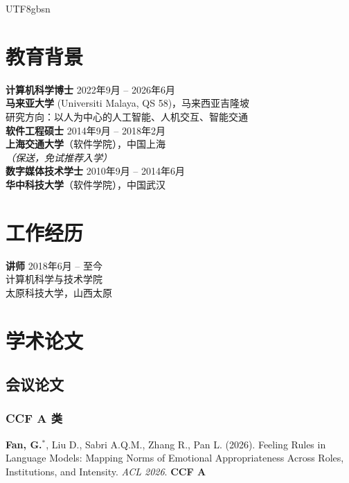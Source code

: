 \documentclass[a4paper,10pt]{article}
\newcommand{\pubitem}[1]{\item #1}
\begin{document}
\begin{CJK*}{UTF8}{gbsn}
\section*{教育背景}

\noindent
\textbf{计算机科学博士} \hfill 2022年9月 -- 2026年6月\\
\textbf{马来亚大学} (Universiti Malaya, QS 58)，马来西亚吉隆坡 \\
研究方向：以人为中心的人工智能、人机交互、智能交通 \\

\noindent
\textbf{软件工程硕士} \hfill 2014年9月 -- 2018年2月 \\
\textbf{上海交通大学}（软件学院），中国上海 \\
\textit{（保送，免试推荐入学）} \\

\noindent
\textbf{数字媒体技术学士} \hfill 2010年9月 -- 2014年6月 \\
\textbf{华中科技大学}（软件学院），中国武汉

\section*{工作经历}

\noindent
\textbf{讲师} \hfill 2018年6月 -- 至今 \\
计算机科学与技术学院 \\
太原科技大学，山西太原

\section*{学术论文\footnotemark[1]}

\subsection*{会议论文}

\subsubsection*{CCF A 类}

\begin{enumerate}[label={[C\arabic*]}]
    \pubitem{\textbf{Fan, G.}$^*$, Liu D., Sabri A.Q.M., Zhang R., Pan L. (2026). Feeling Rules in Language Models: Mapping Norms of Emotional Appropriateness Across Roles, Institutions, and Intensity. \textit{ACL 2026}. \textbf{CCF A}}
    

\end{enumerate}
\end{CJK*}
\end{document}
